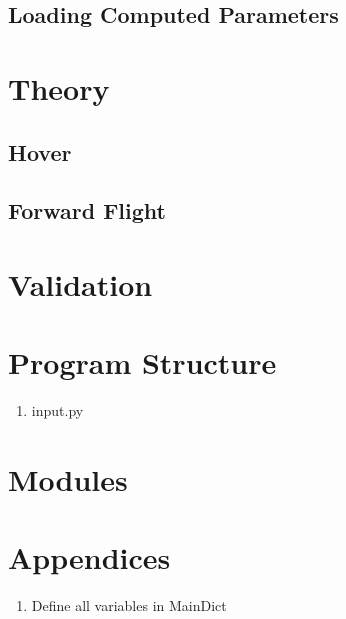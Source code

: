 \documentclass[journal ]{new-aiaa}
\begin{document}
\subsection{Loading Computed Parameters}



\section{Theory}
\subsection{Hover}
\subsection{Forward Flight}

\section{Validation}

\section{Program Structure}
\label{sec:Program Structure}

\begin{enumerate}
\item input.py
\end{enumerate}

\section{Modules}

\section{Appendices}
\begin{enumerate}
\item Define all variables in MainDict
\end{enumerate}
\end{document}
